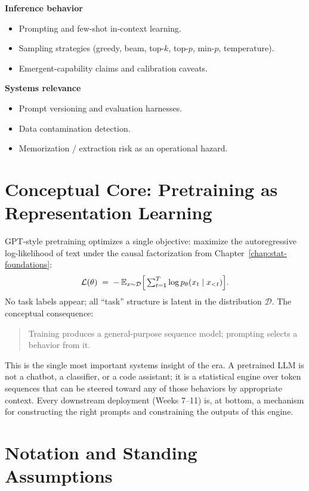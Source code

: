 \textbf{Inference behavior}
\begin{itemize}
  \item Prompting and few-shot in-context learning.
  \item Sampling strategies (greedy, beam, top-$k$, top-$p$, min-$p$,
        temperature).
  \item Emergent-capability claims and calibration caveats.
\end{itemize}

\textbf{Systems relevance}
\begin{itemize}
  \item Prompt versioning and evaluation harnesses.
  \item Data contamination detection.
  \item Memorization / extraction risk as an operational hazard.
\end{itemize}

\section{Conceptual Core: Pretraining as Representation Learning}

GPT-style pretraining optimizes a single objective: maximize the
autoregressive log-likelihood of text under the causal factorization
from Chapter~\ref{chap:stat-foundations}:
\begin{equation}
\label{eq:ch6-pretrain-obj}
\mathcal{L}(\theta)
 \;=\; -\,\mathbb{E}_{x \sim \mathcal{D}}
       \Bigl[\,\textstyle\sum_{t=1}^{T} \log p_\theta(x_t \mid x_{<t})\Bigr].
\end{equation}
No task labels appear; all ``task'' structure is latent in the
distribution $\mathcal{D}$. The conceptual consequence:
\begin{quote}
Training produces a general-purpose sequence model;
prompting selects a behavior from it.
\end{quote}
This is the single most important systems insight of the era. A
pretrained LLM is not a chatbot, a classifier, or a code assistant;
it is a statistical engine over token sequences that can be steered
toward any of those behaviors by appropriate context. Every
downstream deployment (Weeks 7--11) is, at bottom, a mechanism for
constructing the right prompts and constraining the outputs of this
engine.

\section{Notation and Standing Assumptions}
\label{sec:ch6-notation}

